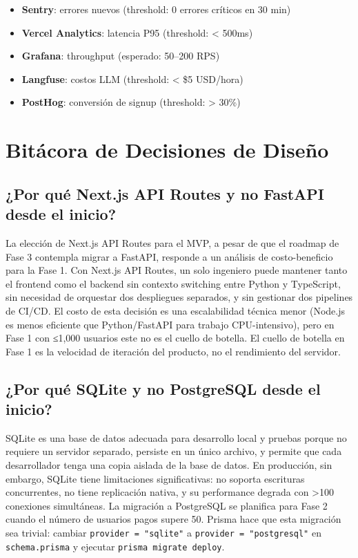 \begin{itemize}[leftmargin=1.4em]
\item \textbf{Sentry}: errores nuevos (threshold: 0 errores críticos en 30 min)
\item \textbf{Vercel Analytics}: latencia P95 (threshold: < 500ms)
\item \textbf{Grafana}: throughput (esperado: 50--200 RPS)
\item \textbf{Langfuse}: costos LLM (threshold: < \$5 USD/hora)
\item \textbf{PostHog}: conversión de signup (threshold: > 30\%)
\end{itemize}

\chapter{Bitácora de Decisiones de Diseño}
\label{app:design-decisions}

\section{¿Por qué Next.js API Routes y no FastAPI desde el inicio?}
La elección de Next.js API Routes para el MVP, a pesar de que el roadmap de Fase 3 contempla migrar a FastAPI, responde a un análisis de costo-beneficio para la Fase 1. Con Next.js API Routes, un solo ingeniero puede mantener tanto el frontend como el backend sin contexto switching entre Python y TypeScript, sin necesidad de orquestar dos despliegues separados, y sin gestionar dos pipelines de CI/CD. El costo de esta decisión es una escalabilidad técnica menor (Node.js es menos eficiente que Python/FastAPI para trabajo CPU-intensivo), pero en Fase 1 con ≤1,000 usuarios este no es el cuello de botella. El cuello de botella en Fase 1 es la velocidad de iteración del producto, no el rendimiento del servidor.

\section{¿Por qué SQLite y no PostgreSQL desde el inicio?}
SQLite es una base de datos adecuada para desarrollo local y pruebas porque no requiere un servidor separado, persiste en un único archivo, y permite que cada desarrollador tenga una copia aislada de la base de datos. En producción, sin embargo, SQLite tiene limitaciones significativas: no soporta escrituras concurrentes, no tiene replicación nativa, y su performance degrada con >100 conexiones simultáneas. La migración a PostgreSQL se planifica para Fase 2 cuando el número de usuarios pagos supere 50. Prisma hace que esta migración sea trivial: cambiar \texttt{provider = "sqlite"} a \texttt{provider = "postgresql"} en \texttt{schema.prisma} y ejecutar \texttt{prisma migrate deploy}.


